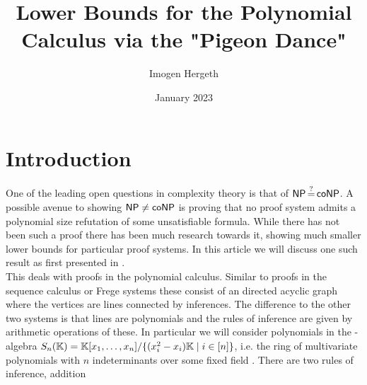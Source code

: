 \documentclass{article}
\title{Lower Bounds for the Polynomial Calculus via the "Pigeon Dance"}
\author{Imogen Hergeth}
\date{January 2023}
\newcommand{\Sn}{S_n(\KK)}
\begin{document}
\maketitle

\section{Introduction}
One of the leading open questions in complexity theory is that of $\NP \queq \co\NP$. A possible avenue to showing $\NP \neq \co\NP$ is proving that no proof system admits a polynomial size refutation of some unsatisfiable formula. While there has not been such a proof there has been much research towards it, showing much smaller lower bounds for particular proof systems. In this article we will discuss one such result as first presented in \cite{raz}.\\
This deals with proofs in the polynomial calculus. Similar to proofs in the sequence calculus or Frege systems these consist of an directed acyclic graph where the vertices are lines connected by inferences. The difference to the other two systems is that lines are polynomials and the rules of inference are given by arithmetic operations of these. In particular we will consider polynomials in the \KK-algebra $\Sn = \KK[x_1, \ldots, x_n] / \{(x_i^2 - x_i)\KK \mid i \in [n] \}$, i.e. the ring of multivariate polynomials with $n$ indeterminants over some fixed field \KK. There are two rules of inference, addition
\begin{prooftree}
\end{prooftree}



















\newpage
\printbibliography
\end{document}
